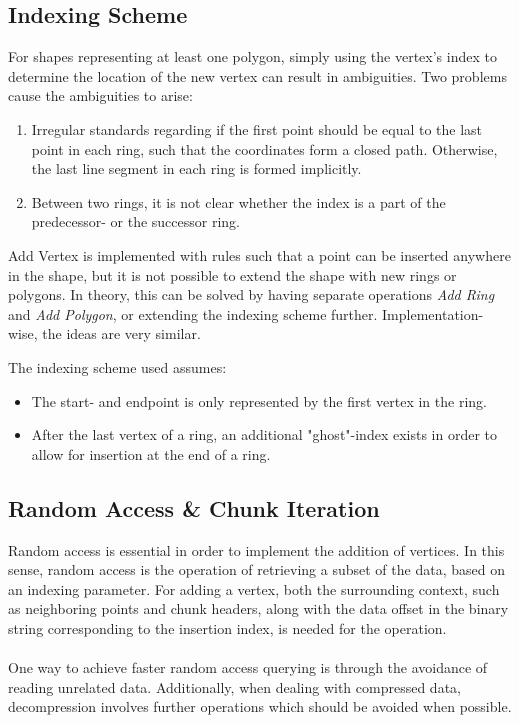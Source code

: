 \subsection{Indexing Scheme}
For shapes representing at least one polygon, simply using the vertex's index to determine the location of the new vertex can result in ambiguities. Two problems cause the ambiguities to arise:
\begin{enumerate}
    \item Irregular standards regarding if the first point should be equal to the last point in each ring, such that the coordinates form a closed path. Otherwise, the last line segment in each ring is formed implicitly.
    \item Between two rings, it is not clear whether the index is a part of the predecessor- or the successor ring.
\end{enumerate}
Add Vertex is implemented with rules such that a point can be inserted anywhere in the shape, but it is not possible to extend the shape with new rings or polygons. In theory, this can be solved by having separate operations \emph{Add Ring} and \emph{Add Polygon}, or extending the indexing scheme further. Implementation-wise, the ideas are very similar.

The indexing scheme used assumes:
\begin{itemize}
    \item The start- and endpoint is only represented by the first vertex in the ring. 
    \item After the last vertex of a ring, an additional "ghost"-index exists in order to allow for insertion at the end of a ring.
\end{itemize}

\subsection{Random Access \& Chunk Iteration}
\label{Random_access}

Random access is essential in order to implement the addition of vertices. In this sense, random access is the operation of retrieving a subset of the data, based on an indexing parameter. For adding a vertex, both the surrounding context, such as neighboring points and chunk headers, along with the data offset in the binary string corresponding to the insertion index, is needed for the operation.
\\\\
One way to achieve faster random access querying is through the avoidance of reading unrelated data. Additionally, when dealing with compressed data, decompression involves further operations which should be avoided when possible.

